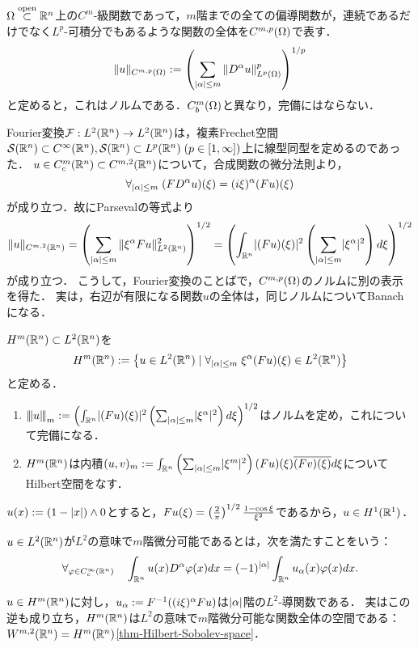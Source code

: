 \documentclass[uplatex,dvipdfmx]{jsreport}
\begin{document}
\begin{notation}
    $\Omega\overset{\mathrm{open}}{\subset}\mathbb{R}^n$上の$C^m$-級関数であって，$m$階までの全ての偏導関数が，連続であるだけでなく$L^p$-可積分でもあるような関数の全体を$C^{m,p}(\Omega)$で表す．
    \[\|u\|_{C^{m,p}(\Omega)}:=\left(\sum_{\lvert\alpha\rvert\le m}\|D^\alpha u\|^p_{L^p(\Omega)}\right)^{1/p}\]
    と定めると，これはノルムである．$C_b^m(\Omega)$と異なり，完備にはならない．
\end{notation}

\begin{discussion}
    Fourier変換$\mathcal{F}:L^2(\mathbb{R}^n)\to L^2(\mathbb{R}^n)$は，複素Frechet空間$\mathcal{S}(\mathbb{R}^n)\subset C^\infty(\mathbb{R}^n),\mathcal{S}(\mathbb{R}^n)\subset L^p(\mathbb{R}^n)\;(p\in[1,\infty])$上に線型同型を定めるのであった．
    $u\in C^m_c(\mathbb{R}^n)\subset C^{m,2}(\mathbb{R}^n)$について，合成関数の微分法則より，
    \[\forall_{\lvert\alpha\rvert\le m}\;(FD^\alpha u)(\xi)=(i\xi)^\alpha(Fu)(\xi)\]
    が成り立つ．故にParsevalの等式より
    \[\|u\|_{C^{m,2}(\mathbb{R}^n)}=\left(\sum_{\lvert\alpha\rvert\le m}\|\xi^\alpha Fu\|^2_{L^2(\mathbb{R}^n)}\right)^{1/2}=\left(\int_{\mathbb{R}^n}\lvert(Fu)(\xi)\rvert^2\left(\sum_{\lvert\alpha\rvert\le m}\lvert\xi^\alpha\rvert^2\right)d\xi\right)^{1/2}\]
    が成り立つ．
    こうして，Fourier変換のことばで，$C^{m,p}(\Omega)$のノルムに別の表示を得た．
    実は，右辺が有限になる関数$u$の全体は，同じノルムについてBanachになる．
\end{discussion}

\begin{proposition}
    $H^m(\mathbb{R}^n)\subset L^2(\mathbb{R}^n)$を
    \[H^m(\mathbb{R}^n):=\left\{u\in L^2(\mathbb{R}^n)\mid\forall_{\lvert\alpha\rvert\le m}\;\xi^\alpha(Fu)(\xi)\in L^2(\mathbb{R}^n)\right\}\]
    と定める．
    \begin{enumerate}
        \item ${\left\vert\kern-0.25ex\left\vert\kern-0.25ex\left\vert u \right\vert\kern-0.25ex\right\vert\kern-0.25ex\right\vert}_m:=\left(\int_{\mathbb{R}^n}\lvert(Fu)(\xi)\rvert^2\left(\sum_{\lvert\alpha\rvert\le m}\lvert\xi^\alpha\rvert^2\right)d\xi\right)^{1/2}$はノルムを定め，これについて完備になる．
        \item $H^m(\mathbb{R}^n)$は内積$(u,v)_m:=\int_{\mathbb{R}^n}\left(\sum_{\lvert\alpha\rvert\le m}\lvert\xi^m\rvert^2\right)(Fu)(\xi)\overline{(Fv)(\xi)}d\xi$についてHilbert空間をなす．
    \end{enumerate}
\end{proposition}

\begin{example}[Sobolev空間の微分不可能な元]
    $u(x):=(1-\lvert x\rvert)\land0$とすると，$Fu(\xi)=\left(\frac{2}{\pi}\right)^{1/2}\frac{1-\cos\xi}{\xi^2}$であるから，$u\in H^1(\mathbb{R}^1)$．
\end{example}

\begin{definition}
    $u\in L^2(\mathbb{R}^n)$が$L^2$の意味で$m$階微分可能であるとは，次を満たすことをいう：
    \[\forall_{\varphi\in C_c^\infty(\mathbb{R}^n)}\quad\int_{\mathbb{R}^n}u(x)D^\alpha\varphi(x)dx=(-1)^{\lvert\alpha\rvert}\int_{\mathbb{R}^n}u_\alpha(x)\varphi(x)dx.\]
\end{definition}
\begin{lemma}
    $u\in H^m(\mathbb{R}^n)$に対し，$u_\alpha:=F^{-1}((i\xi)^\alpha Fu)$は$\lvert\alpha\rvert$階の$L^2$-導関数である．
    実はこの逆も成り立ち，$H^m(\mathbb{R}^n)$は$L^2$の意味で$m$階微分可能な関数全体の空間である：$W^{m,2}(\mathbb{R}^n)=H^m(\mathbb{R}^n)$\ref{thm-Hilbert-Sobolev-space}．
\end{lemma}
\end{document}
